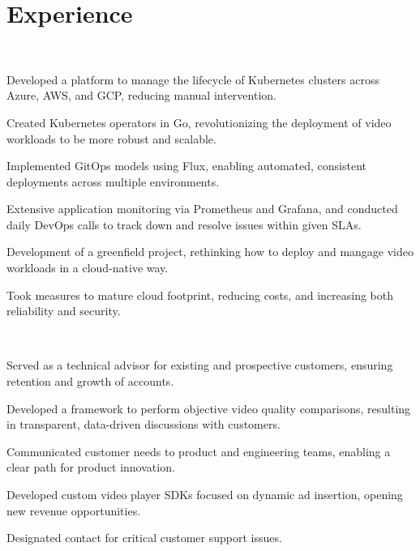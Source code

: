 \documentclass[]{hieudo-build}
\begin{document}
\hfill
\begin{minipage}[t]{0.69\textwidth} 

\section{Experience}

\\
\vspace{0.9em} %
\begin{tightemize}
\item Developed a platform to manage the lifecycle of Kubernetes clusters across Azure, AWS, and GCP, reducing manual intervention.
\item Created Kubernetes operators in Go, revolutionizing the deployment of video workloads to be more robust and scalable.
\item Implemented GitOps models using Flux, enabling automated, consistent deployments across multiple environments.
\item Extensive application monitoring via Prometheus and Grafana, and conducted daily DevOps calls to track down and resolve issues within given SLAs.
\item Development of a greenfield project, rethinking how to deploy and mangage video workloads in a cloud-native way.
\item Took measures to mature cloud footprint, reducing costs, and increasing both reliability and security.

\end{tightemize}

\sectionsep

\\
\begin{tightemize}
\item Served as a technical advisor for existing and prospective customers, ensuring retention and growth of accounts.
\item Developed a framework to perform objective video quality comparisons, resulting in transparent, data-driven discussions with customers.
\item Communicated customer needs to product and engineering teams, enabling a clear path for product innovation.
\item Developed custom video player SDKs focused on dynamic ad insertion, opening new revenue opportunities. 
\item Designated contact for critical customer support issues.
\end{tightemize}


\end{minipage}
\end{document}
